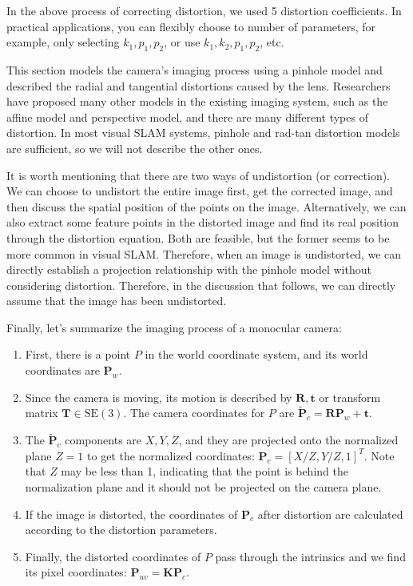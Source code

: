 In the above process of correcting distortion, we used 5 distortion coefficients. In practical applications, you can flexibly choose to number of parameters, for example, only selecting $k_1, p_1, p_2$, or use $k_1, k_2, p_1, p_2$, etc.

This section models the camera's imaging process using a pinhole model and described the radial and tangential distortions caused by the lens. Researchers have proposed many other models in the existing imaging system, such as the affine model and perspective model, and there are many different types of distortion. In most visual SLAM systems, pinhole and rad-tan distortion models are sufficient, so we will not describe the other ones.

It is worth mentioning that there are two ways of undistortion (or correction). We can choose to undistort the entire image first, get the corrected image, and then discuss the spatial position of the points on the image. Alternatively, we can also extract some feature points in the distorted image and find its real position through the distortion equation. Both are feasible, but the former seems to be more common in visual SLAM. Therefore, when an image is undistorted, we can directly establish a projection relationship with the pinhole model without considering distortion. Therefore, in the discussion that follows, we can directly assume that the image has been undistorted.

Finally, let's summarize the imaging process of a monocular camera:

\begin{enumerate}
	\item First, there is a point $P$ in the world coordinate system, and its world coordinates are $\mathbf{P}_w$.
	\item Since the camera is moving, its motion is described by $\mathbf{R}, \mathbf{t}$ or  transform matrix $\mathbf{T} \in \mathrm{SE}(3)$. The camera coordinates for $P$ are $\tilde{\mathbf{P}}_c = \mathbf{R} \mathbf{P}_w + \mathbf{t}$.
	\item The $\tilde{\mathbf{P}}_c$ components are $X,Y, Z$, and they are projected onto the normalized plane $Z=1$ to get the normalized coordinates: $\mathbf{P}_c = [X/Z, Y/Z, 1]^T$. Note that $Z$ may be less than 1, indicating that the point is behind the normalization plane and it should not be projected on the camera plane.
	\item If the image is distorted, the coordinates of $\mathbf{P}_c$ after distortion are calculated according to the distortion parameters.
	\item Finally, the distorted coordinates of $P$ pass through the intrinsics and we find its pixel coordinates: $\mathbf{P}_{uv} = \mathbf{K} \mathbf{P}_c$.
\end{enumerate}

